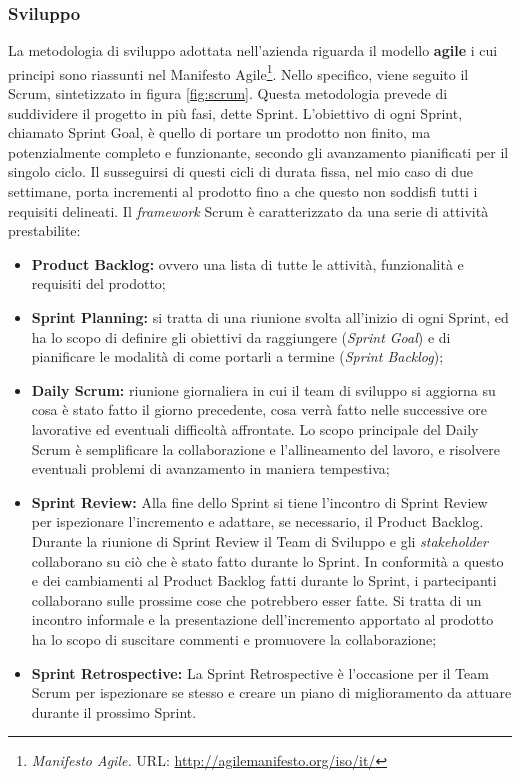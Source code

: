 \subsubsection*{Sviluppo}
La metodologia di sviluppo adottata nell'azienda riguarda il modello \textbf{agile} i cui principi sono riassunti nel Manifesto Agile\footnote{\textit{Manifesto Agile.} URL: \href{http://agilemanifesto.org/iso/it/}{http://agilemanifesto.org/iso/it/}}. 
Nello specifico, viene seguito il  Scrum, sintetizzato in figura \ref{fig:scrum}.
Questa metodologia prevede di suddividere il progetto in più fasi, dette Sprint. L'obiettivo di ogni Sprint, chiamato Sprint Goal, è quello di portare un prodotto non finito, ma potenzialmente completo e funzionante, secondo gli avanzamento pianificati per il singolo ciclo. Il susseguirsi di questi cicli di durata fissa, nel mio caso di due settimane, porta incrementi al prodotto fino a che questo non soddisfi tutti i requisiti delineati.
Il \textit{\gls{framework}} Scrum è caratterizzato da una serie di attività prestabilite:
\begin{itemize}
\item \textbf{Product Backlog:} ovvero una lista di tutte le attività, funzionalità e requisiti del prodotto;
\item \textbf{Sprint Planning:} si tratta di una riunione svolta all'inizio di ogni Sprint, ed ha lo scopo di definire gli obiettivi da raggiungere (\textit{Sprint Goal}) e di pianificare le modalità di come portarli a termine (\textit{Sprint Backlog});
\item \textbf{Daily Scrum:} riunione giornaliera in cui il team di sviluppo si aggiorna su cosa è stato fatto il giorno precedente, cosa verrà fatto nelle successive ore lavorative ed eventuali difficoltà affrontate. Lo scopo principale del Daily Scrum è semplificare la collaborazione e l'allineamento del lavoro, e risolvere eventuali problemi di avanzamento in maniera tempestiva;
\item \textbf{Sprint Review:} Alla fine dello Sprint si tiene l'incontro di Sprint Review per ispezionare l'incremento e adattare, se necessario, il Product Backlog. Durante la riunione di Sprint Review il Team di Sviluppo e gli \textit{stakeholder} collaborano su ciò che è stato fatto durante lo Sprint. In conformità a questo e dei cambiamenti al Product Backlog fatti durante lo Sprint, i partecipanti collaborano sulle prossime cose che potrebbero esser fatte. Si tratta di un incontro informale e la presentazione dell'incremento apportato al prodotto ha lo scopo di suscitare commenti e promuovere la collaborazione;
\item \textbf{Sprint Retrospective:} La Sprint Retrospective è l'occasione per il Team Scrum per ispezionare se stesso e creare un piano di miglioramento da attuare durante il prossimo Sprint.
\end{itemize}
